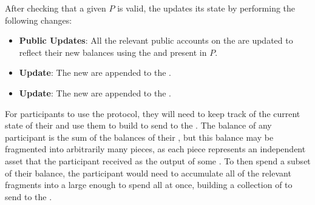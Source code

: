 \begin{definition}
    After checking that a given \TransferPost{} $P$ is valid, the \Ledger{} updates its state by performing the following changes:
    \begin{itemize}
        \item \textbf{Public Updates}: All the relevant public accounts on the \PublicLedger{} are updated to reflect their new balances using the  and  present in $P$.
        \item \textbf{\UTXOSet{} Update}: The new  are appended to the \UTXOSet{}.
        \item \textbf{\VoidNumberSet{} Update}: The new  are appended to the \VoidNumberSet{}.
    \end{itemize}
\end{definition}


For \MantaPay{} participants to use the \Transfer{} protocol, they will need to keep track of the current state of their  and use them to build  to send to the \Ledger{}. The balance of any participant is the sum of the balances of their , but this balance may be fragmented into arbitrarily many pieces, as each piece represents an independent asset that the participant received as the output of some \Transfer{}. To then spend a subset of their balance, the participant would need to accumulate all of the relevant fragments into a large enough \zkAsset{} to spend all at once, building a collection of  to send to the \Ledger{}.

